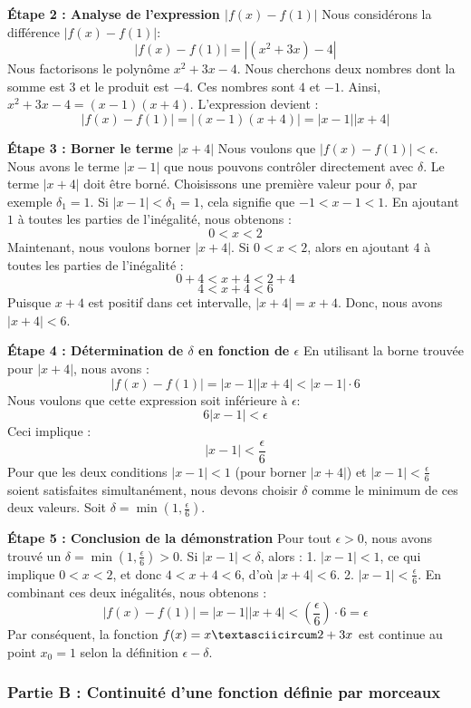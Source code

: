 \documentclass[12pt,a4paper]{report}
\begin{document}
\textbf{Étape 2 : Analyse de l'expression $|f(x) - f(1)|$}
Nous considérons la différence $|f(x) - f(1)|$:
$$ |f(x) - f(1)| = |(x^2 + 3x) - 4| $$
Nous factorisons le polynôme $x^2 + 3x - 4$. Nous cherchons deux nombres dont la somme est $3$ et le produit est $-4$. Ces nombres sont $4$ et $-1$.
Ainsi, $x^2 + 3x - 4 = (x-1)(x+4)$.
L'expression devient :
$$ |f(x) - f(1)| = |(x-1)(x+4)| = |x-1||x+4| $$

\textbf{Étape 3 : Borner le terme $|x+4|$}
Nous voulons que $|f(x) - f(1)| < \epsilon$. Nous avons le terme $|x-1|$ que nous pouvons contrôler directement avec $\delta$. Le terme $|x+4|$ doit être borné.
Choisissons une première valeur pour $\delta$, par exemple $\delta_1 = 1$.
Si $|x-1| < \delta_1 = 1$, cela signifie que $-1 < x-1 < 1$.
En ajoutant $1$ à toutes les parties de l'inégalité, nous obtenons :
$$ 0 < x < 2 $$
Maintenant, nous voulons borner $|x+4|$. Si $0 < x < 2$, alors en ajoutant $4$ à toutes les parties de l'inégalité :
$$ 0+4 < x+4 < 2+4 $$
$$ 4 < x+4 < 6 $$
Puisque $x+4$ est positif dans cet intervalle, $|x+4| = x+4$.
Donc, nous avons $|x+4| < 6$.

\textbf{Étape 4 : Détermination de $\delta$ en fonction de $\epsilon$}
En utilisant la borne trouvée pour $|x+4|$, nous avons :
$$ |f(x) - f(1)| = |x-1||x+4| < |x-1| \cdot 6 $$
Nous voulons que cette expression soit inférieure à $\epsilon$:
$$ 6|x-1| < \epsilon $$
Ceci implique :
$$ |x-1| < \frac{\epsilon}{6} $$
Pour que les deux conditions $|x-1| < 1$ (pour borner $|x+4|$) et $|x-1| < \frac{\epsilon}{6}$ soient satisfaites simultanément, nous devons choisir $\delta$ comme le minimum de ces deux valeurs.
Soit $\delta = \min\left(1, \frac{\epsilon}{6}\right)$.

\textbf{Étape 5 : Conclusion de la démonstration}
Pour tout $\epsilon > 0$, nous avons trouvé un $\delta = \min\left(1, \frac{\epsilon}{6}\right) > 0$.
Si $|x-1| < \delta$, alors :
1.  $|x-1| < 1$, ce qui implique $0 < x < 2$, et donc $4 < x+4 < 6$, d'où $|x+4| < 6$.
2.  $|x-1| < \frac{\epsilon}{6}$.
En combinant ces deux inégalités, nous obtenons :
$$ |f(x) - f(1)| = |x-1||x+4| < \left(\frac{\epsilon}{6}\right) \cdot 6 = \epsilon $$
Par conséquent, la fonction $f(x) = x\textasciicircum 2 + 3x$ est continue au point $x_0 = 1$ selon la définition $\epsilon-\delta$.

\subsubsection{Partie B : Continuité d'une fonction définie par morceaux}
\end{document}
